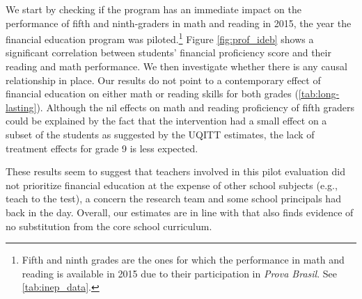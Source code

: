 
We start by checking if the program has an immediate impact on the performance of fifth and ninth-graders in math and reading in 2015, the year the financial education program was piloted.\footnote{Fifth and ninth grades are the ones for which the performance in math and reading is available in 2015 due to their participation in \textit{Prova Brasil}. See \autoref{tab:inep_data}.} Figure \autoref{fig:prof_ideb} shows a significant correlation between students' financial proficiency score and their reading and math performance. We then investigate whether there is any causal relationship in place. Our results do not point to a contemporary effect of financial education on either math or reading skills for both grades (\autoref{tab:long-lasting}). Although the nil effects on math and reading proficiency of fifth graders could be explained by the fact that the intervention had a small effect on a subset of the students as suggested by the UQITT estimates, the lack of treatment effects for grade 9 is less expected. 


These results seem to suggest that teachers involved in this pilot evaluation did not prioritize financial education at the expense of other school subjects (e.g., teach to the test), a concern the research team and some school principals had back in the day. Overall, our estimates are in line with \cite{batty2020experiential} that also finds evidence of no substitution from the core school curriculum. 

